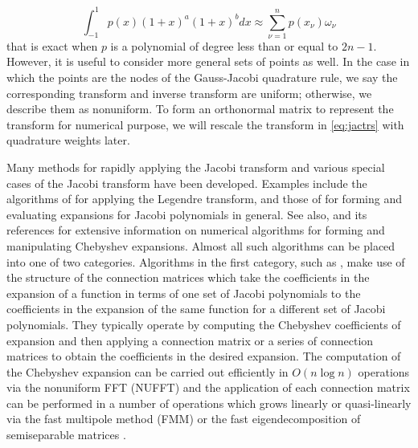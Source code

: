 \documentclass[11pt]{article}
\begin{document}
\begin{equation}
\label{eq:GJquadrule}
\int_{-1}^{1}p(x)(1+x)^{a}(1+x)^{b}dx \approx \sum\limits_{\nu=1}^{n}p(x_{\nu})\omega_{\nu}
\end{equation}
that is exact when $p$ is a  polynomial of degree less than or equal to $2n-1$.  However, it is useful 
to consider  more general sets of points as well.  In the case in which the points 
{\color{blue}{$X$}} are the nodes
of the Gauss-Jacobi quadrature rule, we say the corresponding transform and inverse transform are uniform; otherwise, we describe them as nonuniform. To form an orthonormal matrix to represent the transform for numerical purpose, we will rescale the transform in \eqref{eq:jactrs} with quadrature weights later.





Many methods for rapidly applying the  Jacobi transform and various special cases
of the Jacobi transform have been developed.  Examples include the algorithms of 
 \cite{Iserles2011,hale2014fast,alpert1991fast,Rokhlin1} for applying the Legendre transform, and 
those of \cite{Keiner2} for forming  and evaluating expansions  for Jacobi polynomials in general.
See also,  \cite{chebfun1d} and its references for extensive information on numerical algorithms for forming and manipulating Chebyshev expansions.
Almost all such algorithms can be placed into one of two categories. Algorithms in the first category, such as
{}, 
make use of the structure  of the connection matrices which take the coefficients in the expansion of a function in terms of one set of 
Jacobi polynomials to the coefficients in the expansion of the same function for a different set of Jacobi polynomials.
They typically operate by  computing the Chebyshev coefficients of expansion and then applying a connection matrix or a series
of connection matrices to obtain the coefficients in the desired expansion.
The computation of the Chebyshev expansion can be carried out efficiently in $O(n\log n)$ operations via the nonuniform FFT (NUFFT) \cite{Greengard,Townsend}
and the application of each connection matrix can be performed in a number of operations which grows
linearly or quasi-linearly 
via the fast multipole method (FMM) \cite{alpert1991fast,greengard1987fast,keiner2009computing,Keiner2} 
or the fast eigendecomposition of semiseparable matrices \cite{gemignani2010matrix,keiner2008gegenbauer,Keiner2}.
\end{document}
